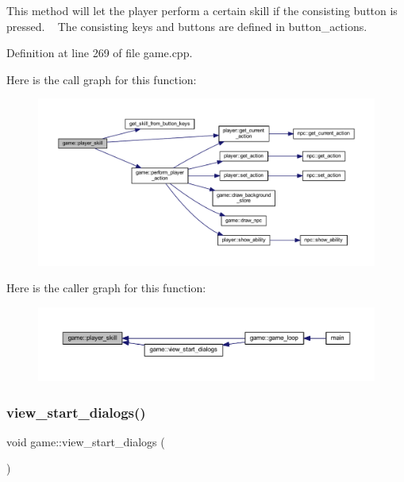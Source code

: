 This method will let the player perform a certain skill if the consisting button is pressed. ~\newline
The consisting keys and buttons are defined in button\+\_\+actions.~\newline


Definition at line 269 of file game.\+cpp.

Here is the call graph for this function\+:
\nopagebreak
\begin{figure}[H]
\begin{center}
\leavevmode
\includegraphics[width=350pt]{classgame_a478a3366ffd0e10713b0abc3adb65696_cgraph}
\end{center}
\end{figure}
Here is the caller graph for this function\+:
\nopagebreak
\begin{figure}[H]
\begin{center}
\leavevmode
\includegraphics[width=350pt]{classgame_a478a3366ffd0e10713b0abc3adb65696_icgraph}
\end{center}
\end{figure}
\mbox{\label{classgame_af99a7ac774385373a015bd3082049bd2}} 
\subsubsection{\texorpdfstring{view\+\_\+start\+\_\+dialogs()}{view\_start\_dialogs()}}
{\footnotesize\ttfamily void game\+::view\+\_\+start\+\_\+dialogs (\begin{DoxyParamCaption}{ }\end{DoxyParamCaption})\hspace{0.3cm}{\ttfamily [private]}}



